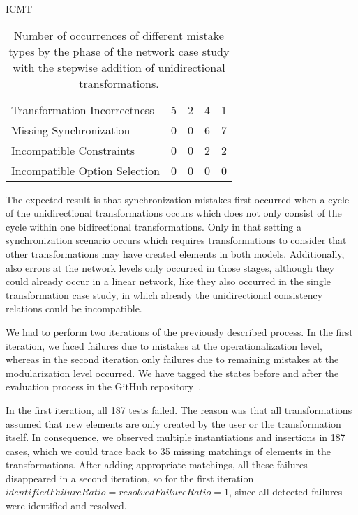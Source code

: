 \begin{copiedFrom}{ICMT}
\begin{table}
\begin{tabular}{L{9.2em}C{4.4em}C{4.4em}C{4.4em}C{4.4em}}
        \midrule
        Transformation Incorrectness & 5 & 2 & 4 & 1 \\
        Missing Synchronization     & 0 & 0 & 6 & 7 \\
        Incompatible Constraints  & 0 & 0 & 2 & 2 \\
        Incompatible \newline Option Selection & 0 & 0 & 0 & 0 \\
        \bottomrule
    \end{tabular}
    \caption[Mistake types by case study phase]{Number of occurrences of different mistake types by the phase of the network case study with the stepwise addition of unidirectional transformations.}
    \label{tab:correctness_evaluation:errors:mistakes_by_phase}
\end{table}

The expected result is that synchronization mistakes first occurred when a cycle of the unidirectional transformations occurs which does not only consist of the cycle within one bidirectional transformations.
Only in that setting a synchronization scenario occurs which requires transformations to consider that other transformations may have created elements in both models.
Additionally, also errors at the network levels only occurred in those stages, although they could already occur in a linear network, like they also occurred in the single transformation case study, in which already the unidirectional consistency relations could be incompatible.



We had to perform two iterations of the previously described process.
In the first iteration, we faced failures due to mistakes at the operationalization level, whereas in the second iteration only failures due to remaining mistakes at the modularization level occurred.
We have tagged the states before and after the evaluation process in the GitHub repository~\cite{vitruvCBSEGithub}.


In the first iteration, all 187 tests failed.
The reason was that all transformations assumed that new elements are only created by the user or the transformation itself.
In consequence, we observed multiple instantiations and insertions in 187 cases, which we could trace back to 35 missing matchings of elements in the transformations.
After adding appropriate matchings, all these failures disappeared in a second iteration, so for the first iteration $\mathit{identifiedFailureRatio = resolvedFailureRatio = 1}$, since all detected failures were identified and resolved.


\end{copiedFrom}
